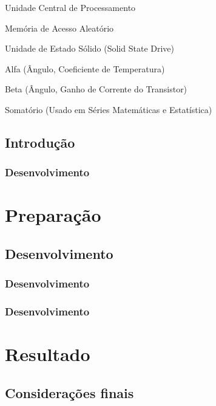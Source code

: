 \documentclass{Arquivos/TrabalhoAcademico}
\begin{document}
\begin{siglas}
    \item[CPU] Unidade Central de Processamento
    \item[RAM] Memória de Acesso Aleatório
    \item[SSD] Unidade de Estado Sólido (Solid State Drive)
\end{siglas}


\begin{simbolos}
    \item[$\alpha$] Alfa (Ângulo, Coeficiente de Temperatura)
    \item[$\beta$] Beta (Ângulo, Ganho de Corrente do Transistor)
    \item[$\sum$] Somatório (Usado em Séries Matemáticas e Estatística)
\end{simbolos}


\Sumario


\textual %


\chapter{Introdução}
\section{Desenvolvimento}

\part{Preparação} %
\chapter{Desenvolvimento}
\section{Desenvolvimento}
\section{Desenvolvimento}

\part{Resultado} %
\chapter{Considerações finais}
\end{document}
